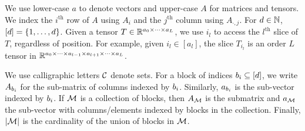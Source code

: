
We use lower-case \( a \) to denote vectors and upper-case \( A \) for matrices
and tensors.
We index the \( i^{\text{th}} \) row of \( A \) using \( A_{i} \) and the
\( j^{\text{th}} \) column using \( A_{\cdot, j} \).
For \( d \in \mathbb{N} \), \( [d] = \left\{1, \ldots, d\right\} \).
Given a tensor \( T \in \mathbb{R}^{a_0 \times \cdots \times a_L} \),
we use \( i_l \) to access the \( l^{\text{th}} \)
slice of \( T \), regardless of position.
For example, given \( i_{l} \in [a_l] \), the slice
\( T_{i_l} \) is an order \( L \) tensor in
\( \mathbb{R}^{a_0 \times \cdots \times a_{l-1} \times a_{l+1} \times \cdots \times a_{L}} \).

We use calligraphic letters \( \mathcal{C} \) denote sets.
For a block of indices \( {b_i} \subseteq [d] \),
we write \( A_{{b_i}} \) for the sub-matrix of columns indexed by \( {b_i} \).
Similarly, \( a_{{b_i}} \) is the sub-vector indexed by \( {b_i} \).
If \( \mathcal{M} \) is a collection of blocks, then \( A_{\mathcal{M}} \) is the submatrix
and \( a_{\mathcal{M}} \) the sub-vector with columns/elements indexed by blocks in
the collection.
Finally, \( \left\vert \mathcal{M}\right\vert \) is the cardinality of the union of blocks in
\( \mathcal{M} \).

